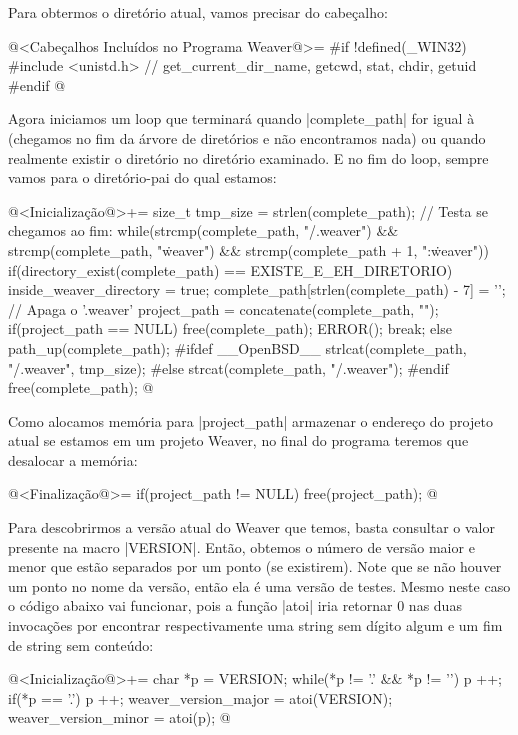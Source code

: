 {Para obtermos o diretório atual, vamos precisar do cabeçalho:

\iniciocodigo
@<Cabeçalhos Incluídos no Programa Weaver@>=
#if !defined(_WIN32)
#include <unistd.h> // get_current_dir_name, getcwd, stat, chdir, getuid
#endif
@
\fimcodigo

Agora iniciamos um loop que terminará quando |complete_path| for igual
à  (chegamos no fim da árvore de diretórios e não
encontramos nada) ou quando realmente existir o
diretório  no diretório examinado. E no fim do
loop, sempre vamos para o diretório-pai do qual estamos:

\iniciocodigo
@<Inicialização@>+=
{
  size_t tmp_size = strlen(complete_path);
  // Testa se chegamos ao fim:
  while(strcmp(complete_path, "/.weaver") &&
	strcmp(complete_path, "\.weaver") &&
	strcmp(complete_path + 1, ":\.weaver")){
    if(directory_exist(complete_path) == EXISTE_E_EH_DIRETORIO){
      inside_weaver_directory = true;
      complete_path[strlen(complete_path) - 7] = '\0'; // Apaga o '.weaver'
      project_path = concatenate(complete_path, "");
      if(project_path == NULL){ free(complete_path); ERROR(); }
      break;
    }
    else{
      path_up(complete_path);
#ifdef __OpenBSD__
      strlcat(complete_path, "/.weaver", tmp_size);
#else
      strcat(complete_path, "/.weaver");
#endif
    }
  }
  free(complete_path);
}
@
\fimcodigo

Como alocamos memória para |project_path| armazenar o endereço do
projeto atual se estamos em um projeto Weaver, no final do programa
teremos que desalocar a memória:

\iniciocodigo
@<Finalização@>=
if(project_path != NULL) free(project_path);
@
\fimcodigo


Para descobrirmos a versão atual do Weaver que temos, basta consultar
o valor presente na macro |VERSION|. Então, obtemos o número de versão
maior e menor que estão separados por um ponto (se existirem). Note
que se não houver um ponto no nome da versão, então ela é uma versão
de testes. Mesmo neste caso o código abaixo vai funcionar, pois a
função |atoi| iria retornar 0 nas duas invocações por encontrar
respectivamente uma string sem dígito algum e um fim de string sem
conteúdo:

\iniciocodigo
@<Inicialização@>+=
{
  char *p = VERSION;
  while(*p != '.' && *p != '\0') p ++;
  if(*p == '.') p ++;
  weaver_version_major = atoi(VERSION);
  weaver_version_minor = atoi(p);
}
@
\fimcodigo

}
